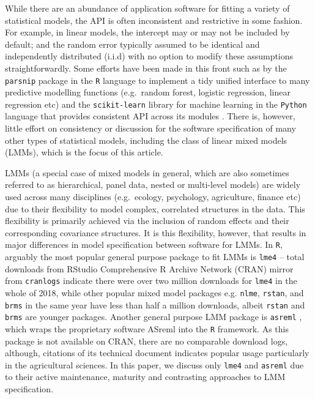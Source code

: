 \documentclass[runningheads]{llncs}\usepackage[]{graphicx}\usepackage[]{color}
\begin{document}
While there are an abundance of application software for fitting a variety of statistical models, the API is often inconsistent and restrictive in some fashion. For example, in linear models, the intercept may or may not be included by default; and the random error typically assumed to be identical and independently distributed (i.i.d) with no option to modify these assumptions straightforwardly. Some efforts have been made in this front such as by the \texttt{parsnip} package \citep{Kuhn2018} in the \texttt{R} language \citep{R2018} to implement a tidy unified interface to many predictive modelling functions (e.g.~random forest, logistic regression, linear regression etc) and the \texttt{scikit-learn} library \citep{scikit-learn} for machine learning in the \texttt{Python} language \citep{van1995python} that provides consistent API across its modules \citep{sklearn_api}. There is, however, little effort on consistency or discussion for the software specification of many other types of statistical models, including the class of linear mixed models (LMMs), which is the focus of this article.



LMMs (a special case of mixed models in general, which are also sometimes referred to as hierarchical, panel data, nested or multi-level models) are widely used across many disciplines (e.g.~ecology, psychology, agriculture, finance etc) due to their flexibility to model complex, correlated structures in the data. This flexibility is primarily achieved via the inclusion of random effects and their corresponding covariance structures. It is this flexibility, however, that results in major differences in model specification between software for LMMs. In \texttt{R}, arguably the most popular general purpose package to fit LMMs is \texttt{lme4} \citep{Bates2015} -- total downloads from RStudio Comprehensive R Archive Network (CRAN) mirror from \texttt{cranlogs} \citep{cranlog} indicate there were over two million downloads for \texttt{lme4} in the whole of 2018, while other popular mixed model packages e.g. \texttt{nlme}, \texttt{rstan}, and \texttt{brms} \citep{nlme, rstan, brmsjss} in the same year have less than half a million downloads, albeit \texttt{rstan} and \texttt{brms} are younger packages. Another general purpose LMM package is \texttt{asreml} \citep{Butler2009}, which wraps the proprietary software ASreml \citep{Gilmour2009} into the \texttt{R} framework. As this package is not available on CRAN, there are no comparable download logs, although, citations of its technical document indicates popular usage particularly in the agricultural sciences. In this paper, we discuss only \texttt{lme4} and \texttt{asreml} due to their active maintenance, maturity and contrasting approaches to LMM specification.
\end{document}
